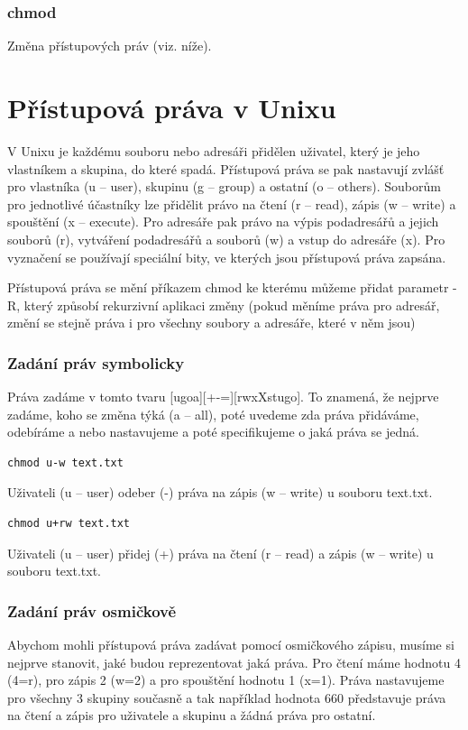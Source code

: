 \documentclass{article}
\begin{document}
\subsubsection{chmod}
Změna přístupových práv (viz. níže).

\section{Přístupová práva v Unixu}
V Unixu je každému souboru nebo adresáři přidělen uživatel, který je jeho vlastníkem a skupina, do které spadá. Přístupová práva se pak nastavují zvlášť pro vlastníka (u -- user), skupinu (g -- group) a ostatní (o -- others). Souborům pro jednotlivé účastníky lze přidělit právo na čtení (r -- read), zápis (w -- write) a spouštění (x -- execute). Pro adresáře pak právo na výpis podadresářů a jejich souborů (r), vytváření podadresářů a souborů (w) a vstup do adresáře (x). Pro vyznačení se používají speciální bity, ve kterých jsou přístupová práva zapsána. 

Přístupová práva se mění příkazem chmod ke kterému můžeme přidat parametr -R, který způsobí rekurzivní aplikaci změny (pokud měníme práva pro adresář, změní se stejně práva i pro všechny soubory a adresáře, které v něm jsou)
\subsubsection{Zadání práv symbolicky}
Práva zadáme v tomto tvaru [ugoa][+-=][rwxXstugo]. To znamená, že nejprve zadáme, koho se změna týká (a -- all), poté uvedeme zda práva přidáváme, odebíráme a nebo nastavujeme a poté specifikujeme o jaká práva se jedná.
\begin{verbatim}
chmod u-w text.txt
\end{verbatim}
Uživateli (u -- user) odeber (-) práva na zápis (w -- write) u souboru text.txt.

\begin{verbatim}
chmod u+rw text.txt
\end{verbatim}
Uživateli (u -- user) přidej (+) práva na čtení (r -- read) a zápis (w -- write) u souboru text.txt.

\subsubsection{Zadání práv osmičkově}
Abychom mohli přístupová práva zadávat pomocí osmičkového zápisu, musíme si nejprve stanovit, jaké  budou reprezentovat jaká práva. Pro čtení máme hodnotu 4 (4=r), pro zápis 2 (w=2) a pro spouštění hodnotu 1 (x=1). Práva nastavujeme pro všechny 3 skupiny současně a tak například hodnota 660 představuje práva na čtení a zápis pro uživatele a skupinu a žádná práva pro ostatní.
\end{document}
